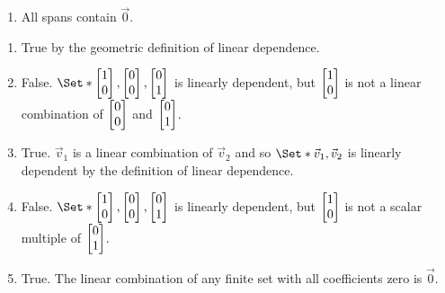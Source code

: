 \begin{exercises}
\begin{problist}
\begin{enumerate}
			\item All spans contain $\vec 0$.
		\end{enumerate}
		\begin{solution}
			\begin{enumerate}
				\item True by the geometric definition of linear dependence.
				\item False. $\Set*{\mat{1\\0},\mat{0\\0},\mat{0\\1}}$ is linearly
				dependent, but $\mat{1\\0}$ is not a linear combination of $\mat{0\\0}$ and $\mat{0\\1}$.
				\item True. $\vec{v}_{1}$ is a linear combination of $\vec{v}_{2}$ and so 
				$\Set*{\vec {v}_{1},\vec{v}_{2}}$ is linearly dependent by the definition
				of linear dependence.
				\item False. $\Set*{\mat{1\\0},\mat{0\\0},\mat{0\\1}}$ is linearly dependent, 
				but $\mat{1\\0}$ is not a scalar multiple of $\mat{0\\1}$.
				\item True. The linear combination of any finite set with all coefficients zero is $\vec {0}$.
			\end{enumerate}
		\end{solution}
	\end{problist}
\end{exercises}
